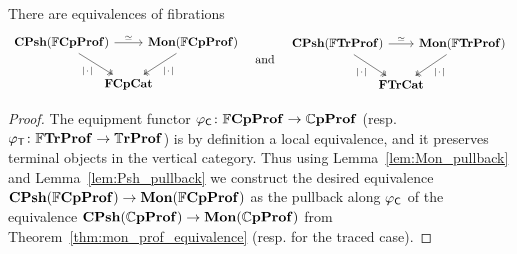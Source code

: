 \documentclass[11pt,oneside,article]{memoir}
\begin{document}
\begin{lemma}
    \label{lem:FrCompProf_Psh_Mon}
  There are equivalences of fibrations
  \begin{equation*}
    \begin{tikzcd}[column sep=-1.25em]
      \CPsh(\dFrCompProf) \ar[rr,"\equiv"] \ar[dr,two heads,"\MOb"']
        && \Mon(\dFrCompProf) \ar[dl,two heads,"\MOb"] \\
      & \FrCompCat &
    \end{tikzcd}
    \quad\tn{and}\quad
    \begin{tikzcd}[column sep=-1.25em]
      \CPsh(\dFrTrProf) \ar[rr,"\equiv"] \ar[dr,two heads,"\MOb"']
        && \Mon(\dFrTrProf) \ar[dl,two heads,"\MOb"] \\
      & \FrTrCat &
    \end{tikzcd}
  \end{equation*}
\end{lemma}
\begin{proof}
  The equipment functor $\varphi_{\mathsf{C}}\colon\mathbb{F}\mathbf{CpProf}\to\mathbb{C}\mathbf{pProf}$ (resp.
  $\varphi_{\mathsf{T}}\colon\mathbb{F}\mathbf{TrProf}\to\mathbb{T}\mathbf{rProf}$) is by definition a local equivalence, and it
  preserves terminal objects in the vertical category. Thus using Lemma~\ref{lem:Mon_pullback} and
  Lemma~\ref{lem:Psh_pullback} we construct the desired equivalence
  $\mathbf{CPsh}(\mathbb{F}\mathbf{CpProf})\to\mathbf{Mon}(\mathbb{F}\mathbf{CpProf})$ as the pullback along $\varphi_{\mathsf{C}}$ of the
  equivalence $\mathbf{CPsh}(\mathbb{C}\mathbf{pProf})\to\mathbf{Mon}(\mathbb{C}\mathbf{pProf})$ from Theorem~\ref{thm:mon_prof_equivalence}
  (resp. for the traced case).
\end{proof}
\end{document}
